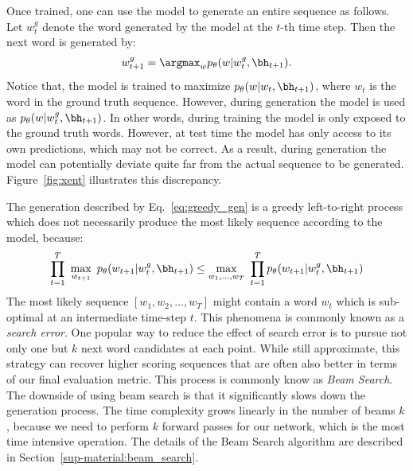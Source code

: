 Once trained, one can use the model to generate an entire sequence as follows. Let $w^g_t$ denote the word generated by the model at the $t$-th time step. Then the next word  is generated by: 
\begin{align}
  \label{eq:greedy_gen}
  w^g_{t + 1} = \argmax_w p_{\theta}(w | w^g_t, \bh_{t+1}).
\end{align}
Notice that, the model is trained
to maximize $p_{\theta}(w | w_t, \bh_{t+1})$, where $w_t$ is the word in the ground truth sequence. However, during generation the model is used as  
$p_{\theta}(w | w^g_t, \bh_{t+1})$. In other words, during training the model is only exposed 
to the ground truth words. However, at test time the model has only
access to its own predictions, which may not be correct. As a result, during generation the model can potentially deviate quite far from the actual sequence to be generated. Figure~\ref{fig:xent} illustrates this discrepancy. 

The generation described by Eq.~\eqref{eq:greedy_gen} is
a greedy left-to-right process which does not necessarily produce
the most likely sequence according to the model, because:
\begin{align*}
    \prod_{t=1}^T ~\max_{w_{t+1}}~p_{\theta}(w_{t+1} | w^g_t, \bh_{t+1}) \leq
    \max_{w_1, \dots, w_T}~\prod_{t=1}^Tp_{\theta}(w_{t+1} | w^g_t, \bh_{t+1})
\end{align*}
The most likely sequence $[w_1, w_2, \dots, w_T]$ might contain a word  $w_t$ which is sub-optimal at an intermediate time-step $t$. This phenomena is commonly known as a {\it search error}. 
One popular way to reduce the effect of search error is to pursue not only one but $k$ next word 
candidates at each point. While still approximate, this strategy can recover 
higher scoring sequences that are often also better in terms of our final evaluation metric.
This process is commonly know as {\it Beam Search}. The downside of using beam search is that it significantly slows down 
the generation process. The time complexity 
grows linearly in the number of beams $k$, because we need to perform 
$k$ forward passes for our network, which is the most time intensive operation. 
The details of the 
Beam Search algorithm are described in Section~\ref{sup-material:beam_search}.


